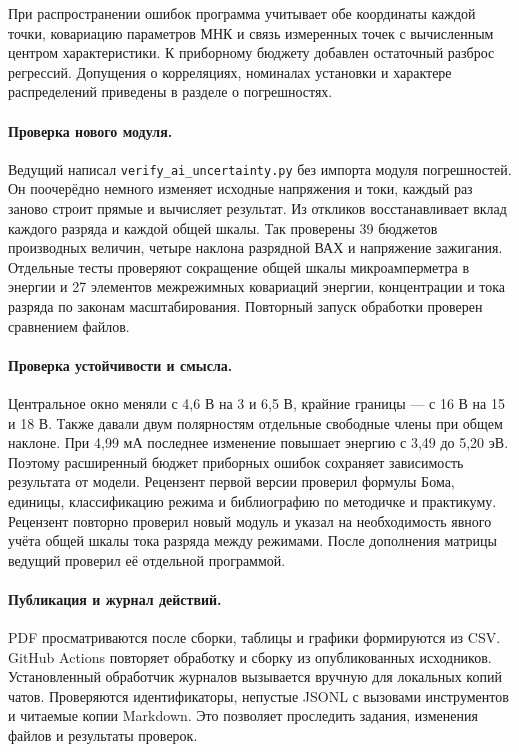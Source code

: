 При распространении ошибок программа учитывает обе координаты каждой точки,
ковариацию параметров МНК и связь измеренных точек с вычисленным центром
характеристики. К приборному бюджету добавлен остаточный разброс регрессий.
Допущения о корреляциях, номиналах установки и характере распределений
приведены в разделе о погрешностях.

\paragraph{Проверка нового модуля.}
Ведущий написал \texttt{verify\_ai\_uncertainty.py} без импорта модуля
погрешностей. Он поочерёдно немного изменяет исходные напряжения и токи,
каждый раз заново строит прямые и вычисляет результат. Из откликов
восстанавливает вклад каждого разряда и каждой общей шкалы.
Так проверены 39 бюджетов производных величин, четыре наклона разрядной ВАХ
и напряжение зажигания. Отдельные тесты проверяют сокращение общей шкалы
микроамперметра в энергии и 27 элементов межрежимных ковариаций
энергии, концентрации и тока разряда по законам масштабирования.
Повторный запуск обработки
проверен сравнением файлов.

\paragraph{Проверка устойчивости и смысла.}
Центральное окно меняли с 4,6 В на 3 и 6,5 В, крайние границы ---
с 16 В на 15 и 18 В. Также давали двум полярностям отдельные свободные
члены при общем наклоне. При 4,99 мА последнее изменение повышает
энергию с 3,49 до 5,20 эВ. Поэтому расширенный бюджет приборных
ошибок сохраняет зависимость результата от модели.
Рецензент первой версии проверил формулы Бома, единицы,
классификацию режима и библиографию по методичке и практикуму.
Рецензент повторно проверил новый модуль и указал на необходимость
явного учёта общей шкалы тока разряда между режимами.
После дополнения матрицы ведущий проверил её отдельной программой.

\paragraph{Публикация и журнал действий.}
PDF просматриваются после сборки, таблицы и графики формируются из CSV.
GitHub Actions повторяет обработку и сборку из опубликованных исходников.
Установленный обработчик журналов вызывается вручную для локальных копий
чатов. Проверяются идентификаторы, непустые JSONL с вызовами инструментов
и читаемые копии Markdown. Это позволяет проследить задания,
изменения файлов и результаты проверок.
